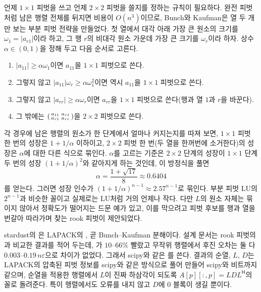 언제 $1\times1$ 피벗을 쓰고 언제 $2\times2$ 피벗을 쓸지를 정하는 규칙이 필요하다. 완전 피벗처럼 남은 행렬 전체를 뒤지면 비용이 $O(n^3)$이므로, Bunch와 Kaufman은 열 두 개만 보는 부분 피벗 전략을 만들었다\cite{bunch1977}. 첫 열에서 대각 아래 가장 큰 원소의 크기를 $\omega_1=|a_{r1}|$이라 하고, 그 행 $r$의 비대각 원소 가운데 가장 큰 크기를 $\omega_r$이라 하자. 상수 $\alpha\in(0,1)$을 정해 두고 다음 순서로 고른다.
\begin{enumerate}
\item $|a_{11}|\ge\alpha\omega_1$이면 $a_{11}$을 $1\times1$ 피벗으로 쓴다.
\item 그렇지 않고 $|a_{11}|\omega_r\ge\alpha\omega_1^2$이면 역시 $a_{11}$을 $1\times1$ 피벗으로 쓴다.
\item 그렇지 않고 $|a_{rr}|\ge\alpha\omega_r$이면 $a_{rr}$을 $1\times1$ 피벗으로 쓴다(행과 열 $1$과 $r$을 바꾼다).
\item 그 밖에는 $\begin{psmallmatrix}a_{11}&a_{r1}\\a_{r1}&a_{rr}\end{psmallmatrix}$을 $2\times2$ 피벗으로 쓴다.
\end{enumerate}
각 경우에 남은 행렬의 원소가 한 단계에서 얼마나 커지는지를 따져 보면, $1\times1$ 피벗 한 번의 성장은 $1+1/\alpha$ 이하이고, $2\times2$ 피벗 한 번(두 열을 한꺼번에 소거한다)의 성장은 $\alpha$에 대한 다른 식으로 묶인다. $\alpha$를 고르는 기준은 $2\times2$ 단계의 성장이 $1\times1$ 단계 두 번의 성장 $(1+1/\alpha)^2$와 같아지게 하는 것인데, 이 방정식을 풀면
\[
\alpha=\frac{1+\sqrt{17}}8\approx0.6404
\]
를 얻는다. 그러면 성장 인수가 $(1+1/\alpha)^{n-1}\approx2.57^{n-1}$로 묶인다. 부분 피벗 LU의 $2^{n-1}$과 비슷한 꼴이고 실제로는 LU처럼 거의 언제나 작다. 다만 $L$의 원소 자체는 묶이지 않아서 정확도가 떨어지는 드문 예가 있고, 이를 막으려고 피벗 후보를 행과 열을 번갈아 따라가며 찾는 rook 피벗이 제안되었다\cite{ashcraft1998}.

\begin{instardust}
stardust의 은 LAPACK의 , 곧 Bunch--Kaufman 분해이다. 설계 문서는 rook 피벗의 과 비교한 결과를 적어 두는데, 가 $10$--$66\%$ 빨랐고 무작위 행렬에서 후진 오차는 둘 다 $0.003$--$0.19\,n\varepsilon$으로 차이가 없었다. 그래서 scipy와 같은 를 쓴다. 결과의 순열, $L$, $D$는 LAPACK의 압축된 피벗 정보를 scipy와 같은 방식으로 풀어 만들어 scipy와 비트까지 같으며, 순열을 적용한 행렬에서 $L$이 진짜 하삼각이 되도록 $A[p][:,p]=LDL^{\mathsf H}$의 꼴로 돌려준다. 특이 행렬에서도 오류를 내지 않고 $D$에 $0$ 블록이 생길 뿐이다.
\end{instardust}

